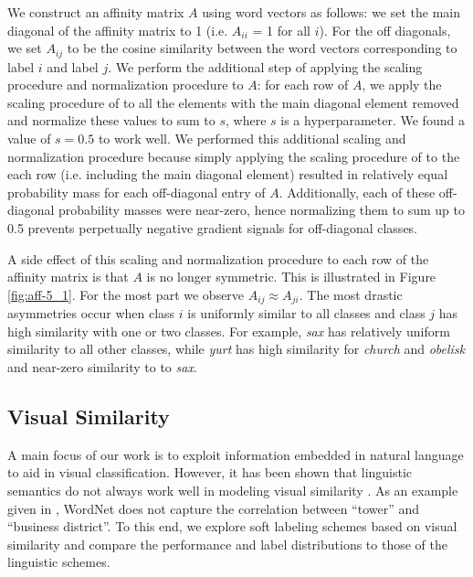 We construct an affinity matrix $A$ using word vectors as follows: we set the
main diagonal of the affinity matrix to 1 (i.e. $A_{ii}$ = 1 for all $i$). For
the off diagonals, we set $A_{ij}$ to be the cosine similarity between the word
vectors corresponding to label $i$ and label $j$. We perform the additional step
of applying the scaling procedure and normalization procedure to $A$: for each
row of $A$, we apply the scaling procedure of \cite{zhao2011large} to all the
elements with the main diagonal element removed and normalize these values to
sum to $s$, where $s$ is a hyperparameter. We found a value of $s = 0.5$ to work
well.  We performed this additional scaling and normalization procedure because
simply applying the scaling procedure of \cite{zhao2011large} to the each row
(i.e.  including the main diagonal element) resulted in relatively equal
probability mass for each off-diagonal entry of $A$. Additionally, each of these
off-diagonal probability masses were near-zero, hence normalizing them to sum up
to 0.5 prevents perpetually negative gradient signals for off-diagonal classes.

A side effect of this scaling and normalization procedure to each row of the
affinity matrix is that $A$ is no longer symmetric. This is illustrated in
Figure \ref{fig:aff-5_1}. For the most part we observe $A_{ij} \approx A_{ji}$.
The most drastic asymmetries occur when class $i$ is uniformly similar to all
classes and class $j$ has high similarity with one or two classes. For example,
\emph{sax} has relatively uniform similarity to all other classes, while
\emph{yurt} has high similarity for \emph{church} and \emph{obelisk} and
near-zero similarity to to \emph{sax}.

\subsection{Visual Similarity}

A main focus of our work is to exploit information embedded in natural language
to aid in visual classification.  However, it has been shown that linguistic
semantics do not always work well in modeling visual similarity
\cite{li2010building}. As an example given in \cite{li2010building}, WordNet
does not capture the correlation between ``tower'' and ``business district''.
To this end, we explore soft labeling schemes based on visual similarity
and compare the performance and label distributions to those of the linguistic
schemes.


